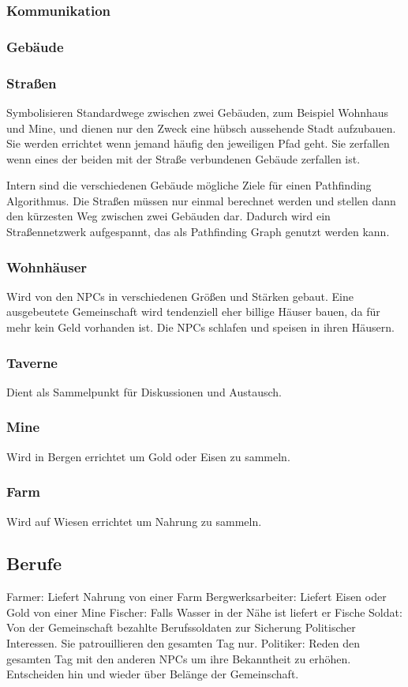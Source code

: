 \documentclass[11pt]{article}
\begin{document}
\subsubsection{Kommunikation}

\subsubsection{Gebäude}

\subsubsection{Straßen}
Symbolisieren Standardwege zwischen zwei Gebäuden, zum Beispiel Wohnhaus und Mine, und dienen nur den Zweck eine hübsch aussehende Stadt aufzubauen. Sie werden errichtet wenn jemand häufig den jeweiligen Pfad geht. Sie zerfallen wenn eines der beiden mit der Straße verbundenen Gebäude zerfallen ist.

Intern sind die verschiedenen Gebäude mögliche Ziele für einen Pathfinding Algorithmus. Die Straßen müssen nur einmal berechnet werden und stellen dann den kürzesten Weg zwischen zwei Gebäuden dar. Dadurch wird ein Straßennetzwerk aufgespannt, das als Pathfinding Graph genutzt werden kann.

\subsubsection{Wohnhäuser}
Wird von den NPCs in verschiedenen Größen und Stärken gebaut. Eine ausgebeutete Gemeinschaft wird tendenziell eher billige Häuser bauen, da für mehr kein Geld vorhanden ist. Die NPCs schlafen und speisen in ihren Häusern.

\subsubsection{Taverne}
Dient als Sammelpunkt für Diskussionen und Austausch.

\subsubsection{Mine}
Wird in Bergen errichtet um Gold oder Eisen zu sammeln.

\subsubsection{Farm}
Wird auf Wiesen errichtet um Nahrung zu sammeln.


\subsection{Berufe}
Farmer: Liefert Nahrung von einer Farm
Bergwerksarbeiter: Liefert Eisen oder Gold von einer Mine
Fischer: Falls Wasser in der Nähe ist liefert er Fische
Soldat: Von der Gemeinschaft bezahlte Berufssoldaten zur Sicherung Politischer Interessen. Sie patrouillieren den gesamten Tag nur.
Politiker: Reden den gesamten Tag mit den anderen NPCs um ihre Bekanntheit zu erhöhen. Entscheiden hin und wieder über Belänge der Gemeinschaft.
\end{document}
